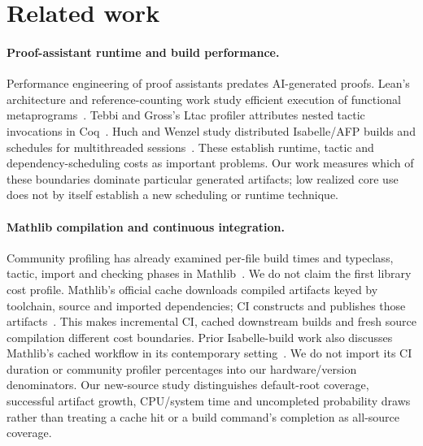 \documentclass[10pt,twocolumn]{article}
\begin{document}
\section{Related work}
\paragraph{Proof-assistant runtime and build performance.}
Performance engineering of proof assistants predates AI-generated proofs.
Lean's architecture and reference-counting work study efficient execution
of functional metaprograms~\cite{lean4,countingBeans}.
Tebbi and Gross's Ltac profiler attributes nested tactic invocations in
Coq~\cite{ltacProfiler2015}. Huch and Wenzel study distributed Isabelle/AFP
builds and schedules for multithreaded sessions~\cite{isabelleBuild2024}.
These establish runtime, tactic and dependency-scheduling costs as important
problems. Our work measures which of these boundaries dominate particular
generated artifacts; low realized core use does not by itself establish a
new scheduling or runtime technique.

\paragraph{Mathlib compilation and continuous integration.}
Community profiling has already examined per-file build times and
typeclass, tactic, import and checking phases in Mathlib~\cite{stollMathlib2024}.
We do not claim the first library cost profile.
Mathlib's official cache downloads compiled artifacts keyed by toolchain,
source and imported dependencies; CI constructs and publishes those
artifacts~\cite{mathlibCache2026}.
This makes incremental CI, cached downstream builds and fresh source
compilation different cost boundaries.
Prior Isabelle-build work also discusses Mathlib's cached workflow in its
contemporary setting~\cite{isabelleBuild2024}.
We do not import its CI duration or community profiler percentages into our
hardware/version denominators.
Our new-source study distinguishes default-root coverage, successful artifact
growth, CPU/system time and uncompleted probability draws rather than
treating a cache hit or a build command's completion as all-source coverage.
\end{document}
